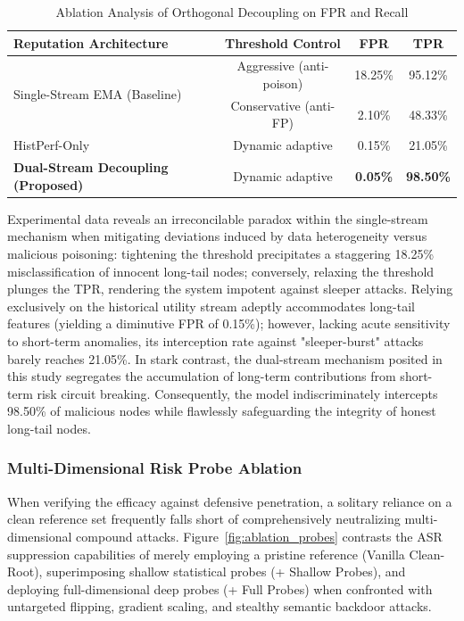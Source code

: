 \documentclass[runningheads,orivec]{llncs}
\begin{document}
\begin{table}[htbp]
    \centering
    \caption{Ablation Analysis of Orthogonal Decoupling on FPR and Recall}
    \label{tab:ablation_stream}
    \begin{tabular}{l c c c}
        \toprule
        \textbf{Reputation Architecture}              & \textbf{Threshold Control} & \textbf{FPR}    & \textbf{TPR}     \\
        \midrule
        \multirow{2}{*}{Single-Stream EMA (Baseline)} & Aggressive (anti-poison)   & 18.25\%         & 95.12\%          \\
                                                      & Conservative (anti-FP)     & 2.10\%          & 48.33\%          \\
        \midrule
        HistPerf-Only                                 & Dynamic adaptive           & 0.15\%          & 21.05\%          \\
        \textbf{Dual-Stream Decoupling (Proposed)}    & Dynamic adaptive           & \textbf{0.05\%} & \textbf{98.50\%} \\
        \bottomrule
    \end{tabular}
\end{table}

Experimental data reveals an irreconcilable paradox within the single-stream mechanism when mitigating deviations induced by data heterogeneity versus malicious poisoning: tightening the threshold precipitates a staggering 18.25\% misclassification of innocent long-tail nodes; conversely, relaxing the threshold plunges the TPR, rendering the system impotent against sleeper attacks. Relying exclusively on the historical utility stream adeptly accommodates long-tail features (yielding a diminutive FPR of 0.15\%); however, lacking acute sensitivity to short-term anomalies, its interception rate against "sleeper-burst" attacks barely reaches 21.05\%. In stark contrast, the dual-stream mechanism posited in this study segregates the accumulation of long-term contributions from short-term risk circuit breaking. Consequently, the model indiscriminately intercepts 98.50\% of malicious nodes while flawlessly safeguarding the integrity of honest long-tail nodes.

\subsubsection{Multi-Dimensional Risk Probe Ablation}
When verifying the efficacy against defensive penetration, a solitary reliance on a clean reference set frequently falls short of comprehensively neutralizing multi-dimensional compound attacks. Figure~\ref{fig:ablation_probes} contrasts the ASR suppression capabilities of merely employing a pristine reference (Vanilla Clean-Root), superimposing shallow statistical probes (+ Shallow Probes), and deploying full-dimensional deep probes (+ Full Probes) when confronted with untargeted flipping, gradient scaling, and stealthy semantic backdoor attacks.
\end{document}
